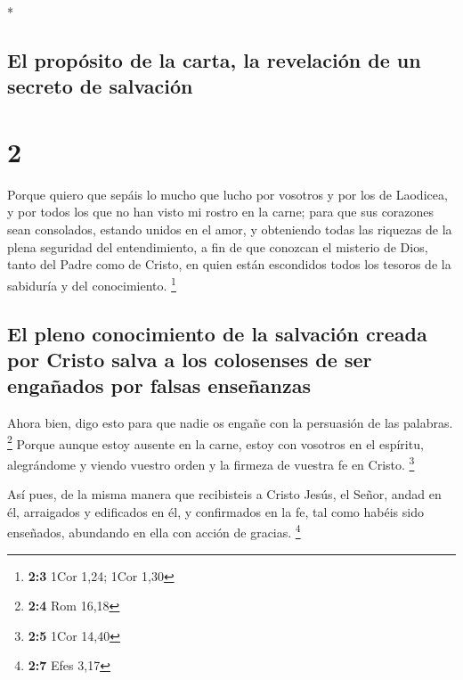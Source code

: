 \begin{paracol}{2}
\begin{otherlanguage}{english}
\end{otherlanguage}

\switchcolumn[0]*

\hypertarget{el-propuxf3sito-de-la-carta-la-revelaciuxf3n-de-un-secreto-de-salvaciuxf3n}{%
\subsection{El propósito de la carta, la revelación de un secreto de
salvación}\label{el-propuxf3sito-de-la-carta-la-revelaciuxf3n-de-un-secreto-de-salvaciuxf3n}}

\hypertarget{section-2}{%
\section{2}\label{section-2}}

 Porque quiero que sepáis lo mucho que lucho por vosotros
y por los de Laodicea, y por todos los que no han visto mi rostro en la
carne;  para que sus corazones sean consolados, estando
unidos en el amor, y obteniendo todas las riquezas de la plena seguridad
del entendimiento, a fin de que conozcan el misterio de Dios, tanto del
Padre como de Cristo,  en quien están escondidos todos los
tesoros de la sabiduría y del conocimiento. \footnote{\textbf{2:3} 1Cor
  1,24; 1Cor 1,30}

\hypertarget{el-pleno-conocimiento-de-la-salvaciuxf3n-creada-por-cristo-salva-a-los-colosenses-de-ser-engauxf1ados-por-falsas-enseuxf1anzas}{%
\subsection{El pleno conocimiento de la salvación creada por Cristo
salva a los colosenses de ser engañados por falsas
enseñanzas}\label{el-pleno-conocimiento-de-la-salvaciuxf3n-creada-por-cristo-salva-a-los-colosenses-de-ser-engauxf1ados-por-falsas-enseuxf1anzas}}

 Ahora bien, digo esto para que nadie os engañe con la
persuasión de las palabras. \footnote{\textbf{2:4} Rom 16,18}
 Porque aunque estoy ausente en la carne, estoy con
vosotros en el espíritu, alegrándome y viendo vuestro orden y la firmeza
de vuestra fe en Cristo. \footnote{\textbf{2:5} 1Cor 14,40}

 Así pues, de la misma manera que recibisteis a Cristo
Jesús, el Señor, andad en él,  arraigados y edificados en
él, y confirmados en la fe, tal como habéis sido enseñados, abundando en
ella con acción de gracias. \footnote{\textbf{2:7} Efes 3,17}


\end{paracol}
